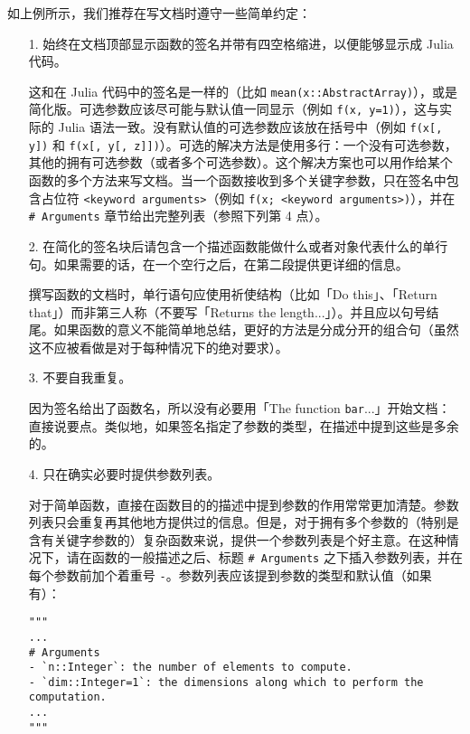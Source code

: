 如上例所示，我们推荐在写文档时遵守一些简单约定：



\begin{itemize}
\item[1.  ] 始终在文档顶部显示函数的签名并带有四空格缩进，以便能够显示成 Julia 代码。

这和在 Julia 代码中的签名是一样的（比如 \texttt{mean(x::AbstractArray)}），或是简化版。可选参数应该尽可能与默认值一同显示（例如 \texttt{f(x, y=1)}），这与实际的 Julia 语法一致。没有默认值的可选参数应该放在括号中（例如 \texttt{f(x[, y])} 和 \texttt{f(x[, y[, z]])}）。可选的解决方法是使用多行：一个没有可选参数，其他的拥有可选参数（或者多个可选参数）。这个解决方案也可以用作给某个函数的多个方法来写文档。当一个函数接收到多个关键字参数，只在签名中包含占位符 \texttt{<keyword arguments>}（例如 \texttt{f(x; <keyword arguments>)}），并在 \texttt{\# Arguments} 章节给出完整列表（参照下列第 4 点）。


\item[2.  ] 在简化的签名块后请包含一个描述函数能做什么或者对象代表什么的单行句。如果需要的话，在一个空行之后，在第二段提供更详细的信息。

撰写函数的文档时，单行语句应使用祈使结构（比如「Do this」、「Return that」）而非第三人称（不要写「Returns the length...」）。并且应以句号结尾。如果函数的意义不能简单地总结，更好的方法是分成分开的组合句（虽然这不应被看做是对于每种情况下的绝对要求）。


\item[3.  ] 不要自我重复。

因为签名给出了函数名，所以没有必要用「The function \texttt{bar}...」开始文档：直接说要点。类似地，如果签名指定了参数的类型，在描述中提到这些是多余的。


\item[4.  ] 只在确实必要时提供参数列表。

对于简单函数，直接在函数目的的描述中提到参数的作用常常更加清楚。参数列表只会重复再其他地方提供过的信息。但是，对于拥有多个参数的（特别是含有关键字参数的）复杂函数来说，提供一个参数列表是个好主意。在这种情况下，请在函数的一般描述之后、标题 \texttt{\# Arguments} 之下插入参数列表，并在每个参数前加个着重号 \texttt{-}。参数列表应该提到参数的类型和默认值（如果有）：


\begin{verbatim}
"""
...
# Arguments
- `n::Integer`: the number of elements to compute.
- `dim::Integer=1`: the dimensions along which to perform the computation.
...
"""
\end{verbatim}



\end{itemize}
